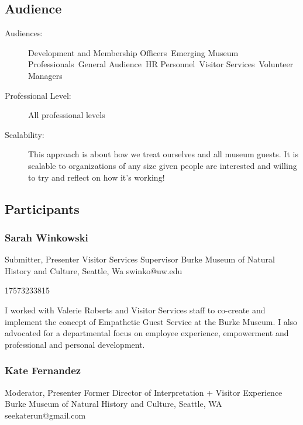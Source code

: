 \documentclass{report}
\begin{document}
              \subsection*{Audience}
                \begin{description}
                  \item [Audiences:]Development and Membership Officers~Emerging Museum Professionals~General Audience~HR Personnel~Visitor Services~Volunteer Managers~
                  \item[Professional Level:]All professional levels~
                \item[Scalability:] This approach is about how we treat ourselves and all museum guests. It is scalable to organizations of any size given people are interested and willing to try and reflect on how it’s working! 

							
              \end{description}
            \subsection*{Participants}
              \subsubsection*{ Sarah Winkowski }
              Submitter, Presenter\newline
              Visitor Services Supervisor\newline
              Burke Museum of Natural History and Culture, Seattle, Wa
              \newline
              swinko@uw.edu\newline
              
              17573233815\newline

              I worked with Valerie Roberts and Visitor Services staff to co-create and implement the concept of Empathetic Guest Service at the Burke Museum. I also advocated for a departmental focus on employee experience, empowerment and professional and personal development.\newline


              
                \subsubsection*{ Kate Fernandez }
                Moderator, Presenter\newline
                Former Director of Interpretation + Visitor Experience\newline
                Burke Museum of Natural History and Culture, Seattle, WA
                \newline
                seekaterun@gmail.com\newline
                
\end{document}
